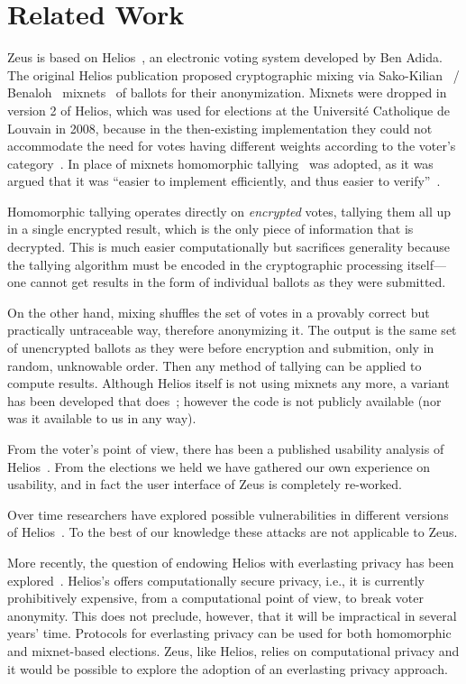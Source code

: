 \documentclass[letterpaper,10pt]{article}
\begin{document}
\section{Related Work}
\label{sec:related}

Zeus is based on Helios~\cite{adida:2008}, an electronic voting system
developed by Ben Adida. The original Helios publication
\cite{adida:2008} proposed cryptographic mixing via
Sako-Kilian~\cite{sako:1995} / Benaloh~\cite{benaloh:2006}
mixnets~\cite{sako:1995} of ballots for their anonymization. Mixnets
were dropped in version 2 of Helios, which was used for elections at
the Universit\'{e} Catholique de Louvain in 2008, because in the
then-existing implementation they could not accommodate the need for
votes having different weights according to the voter's
category~\cite{adida:2009}. In place of mixnets homomorphic
tallying~\cite{cohen:1985} was adopted, as it was argued that it was
``easier to implement efficiently, and thus easier to
verify''~\cite{adida:2009}.

Homomorphic tallying operates directly on \emph{encrypted} votes,
tallying them all up in a single encrypted result, which is the only
piece of information that is decrypted. This is much easier
computationally but sacrifices generality because the tallying
algorithm must be encoded in the cryptographic processing itself---one
cannot get results in the form of individual ballots as they were
submitted.

On the other hand, mixing shuffles the set of votes in a provably
correct but practically untraceable way, therefore anonymizing it. The
output is the same set of unencrypted ballots as they were before
encryption and submition, only in random, unknowable order. Then any
method of tallying can be applied to compute results. Although Helios
itself is not using mixnets any more, a variant has been developed
that does~\cite{bulens:2011}; however the code is not publicly
available (nor was it available to us in any way).

From the voter's point of view, there has been a published usability
analysis of Helios~\cite{karayumak:2011}. From the elections we held
we have gathered our own experience on usability, and in fact the user
interface of Zeus is completely re-worked.

Over time researchers have explored possible vulnerabilities in
different versions of Helios~\cite{heiderich:2011}. To the best of our
knowledge these attacks are not applicable to Zeus.

More recently, the question of endowing Helios with everlasting
privacy has been explored~\cite{demirel:2012}. Helios's offers
computationally secure privacy, i.e., it is currently prohibitively
expensive, from a computational point of view, to break voter
anonymity. This does not preclude, however, that it will be
impractical in several years' time. Protocols for everlasting privacy
can be used for both homomorphic and mixnet-based elections. Zeus,
like Helios, relies on computational privacy and it would be possible
to explore the adoption of an everlasting privacy approach.
\end{document}
